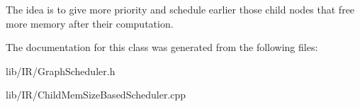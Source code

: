 The idea is to give more priority and schedule earlier those child nodes that free more memory after their computation. 

The documentation for this class was generated from the following files\+:\begin{DoxyCompactItemize}
\item 
lib/\+I\+R/Graph\+Scheduler.\+h\item 
lib/\+I\+R/Child\+Mem\+Size\+Based\+Scheduler.\+cpp\end{DoxyCompactItemize}
